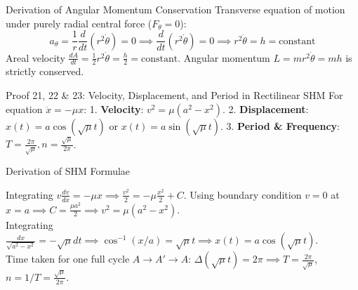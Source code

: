 \documentclass[11pt, a4paper]{report}
\begin{document}
\begin{proofbox}{Derivation of Angular Momentum Conservation}
Transverse equation of motion under purely radial central force ($F_\theta = 0$):
\[
a_\theta = \frac{1}{r} \frac{d}{dt}(r^2 \dot{\theta}) = 0 \implies \frac{d}{dt}(r^2 \dot{\theta}) = 0 \implies r^2 \dot{\theta} = h = \text{constant}
\]
Areal velocity $\frac{dA}{dt} = \frac{1}{2} r^2 \dot{\theta} = \frac{h}{2} = \text{constant}$. Angular momentum $L = m r^2 \dot{\theta} = m h$ is strictly conserved.
\end{proofbox}

\begin{theorembox}{Proof 21, 22 \& 23: Velocity, Displacement, and Period in Rectilinear SHM}
For equation $\ddot{x} = -\mu x$:
1. \textbf{Velocity}: $v^2 = \mu(a^2 - x^2)$.
2. \textbf{Displacement}: $x(t) = a\cos(\sqrt{\mu}t)$ or $x(t) = a\sin(\sqrt{\mu}t)$.
3. \textbf{Period \& Frequency}: $T = \frac{2\pi}{\sqrt{\mu}}, n = \frac{\sqrt{\mu}}{2\pi}$.
\end{theorembox}

\begin{proofbox}{Derivation of SHM Formulae}
\begin{center}
\end{center}

Integrating $v \frac{dv}{dx} = -\mu x \implies \frac{v^2}{2} = -\mu \frac{x^2}{2} + C$. Using boundary condition $v = 0$ at $x = a \implies C = \frac{\mu a^2}{2} \implies v^2 = \mu(a^2 - x^2)$.\\
Integrating $\frac{dx}{\sqrt{a^2 - x^2}} = -\sqrt{\mu} dt \implies \cos^{-1}(x/a) = \sqrt{\mu} t \implies x(t) = a\cos(\sqrt{\mu}t)$.\\
Time taken for one full cycle $A \to A' \to A$: $\Delta(\sqrt{\mu}t) = 2\pi \implies T = \frac{2\pi}{\sqrt{\mu}}$, $n = 1/T = \frac{\sqrt{\mu}}{2\pi}$.
\end{proofbox}
\end{document}
